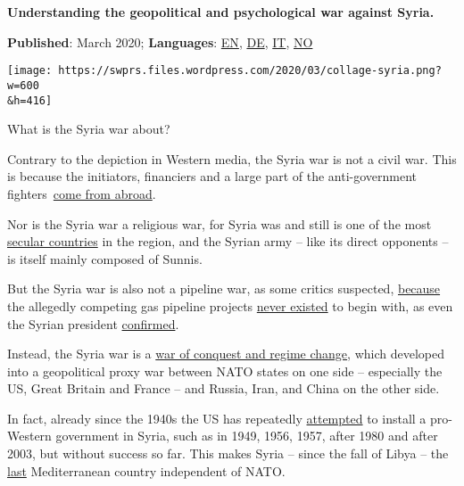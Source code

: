 \textbf{Understanding the geopolitical and psychological war against
Syria.}

\textbf{Published}: March 2020; \textbf{Languages}:
\href{https://swprs.org/the-syria-deception/}{EN},
\href{https://swprs.org/syrienkrieg-geopolitik-medien/}{DE},
\href{https://www.pressenza.com/it/2020/03/guerra-in-siria-geopolitica-e-media/}{IT},
\href{https://steigan.no/2020/03/syriakrigen-geopolitikk-og-media/}{NO}

\texttt{[image: https://swprs.files.wordpress.com/2020/03/collage-syria.png?w=600\\\&h=416]}

What is the Syria war about?

Contrary to the depiction in Western media, the Syria war is not a civil
war. This is because the initiators, financiers and a large part of the
anti-government
fighters~\href{https://www.globalresearch.ca/syria-its-not-a-civil-war-and-it-never-was/5498602}{come
from abroad}.

Nor is the Syria war a religious war, for Syria was and still is one of
the most
\href{https://www.theatlantic.com/international/archive/2013/03/stop-trying-to-make-syrias-war-into-a-sectarian-conflict/274060/}{secular
countries} in the region, and the Syrian army -- like its direct
opponents -- is itself mainly composed of Sunnis.

But the Syria war is also not a pipeline war, as some critics suspected,
\href{https://www.middleeasteye.net/big-story/pipelineistan-conspiracy-war-syria-has-never-been-about-gas}{because}
the allegedly competing gas pipeline projects
\href{https://truthout.org/articles/the-war-against-the-assad-regime-is-not-a-pipeline-war/}{never
existed} to begin with, as even the Syrian president
\href{https://www.youtube.com/watch?v=flaqLAp0Yp4\&t=1674}{confirmed}.

Instead, the Syria war is a
\href{https://swprs.org/us-foreign-policy/}{war of conquest and regime
change}, which developed into a geopolitical proxy war between NATO
states on one side -- especially the US, Great Britain and France -- and
Russia, Iran, and China on the other side.

In fact, already since the 1940s the US has repeatedly
\href{https://en.wikipedia.org/wiki/CIA_activities_in_Syria}{attempted}
to install a pro-Western government in Syria, such as in 1949, 1956,
1957, after 1980 and after 2003, but without success so far. This makes
Syria -- since the fall of Libya -- the
\href{https://www.nato.int/cps/ua/natohq/topics_81136.htm}{last}
Mediterranean country independent of NATO.

